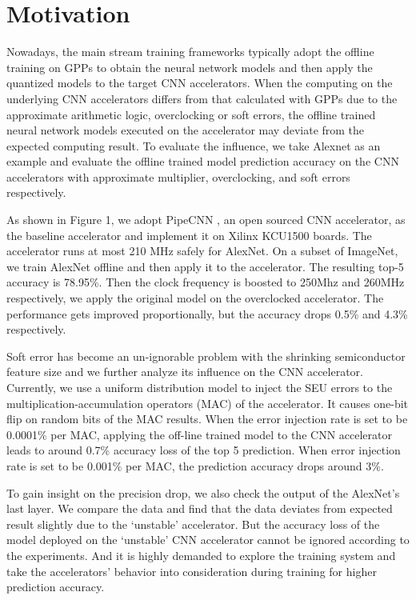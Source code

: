 \section{Motivation} \label{sec:motivation}
Nowadays, the main stream training frameworks typically adopt the offline training
on GPPs to obtain the neural network models and then apply the quantized models to the 
target CNN accelerators. When the computing on the underlying CNN accelerators differs
from that calculated with GPPs due to the approximate arithmetic logic, overclocking or 
soft errors, the offline trained neural network models executed on the accelerator 
may deviate from the expected computing result. To evaluate the influence, 
we take Alexnet as an example and evaluate the offline trained model prediction 
accuracy on the CNN accelerators with approximate multiplier, 
overclocking, and soft errors respectively. 


  As shown in Figure 1, we adopt PipeCNN\cite{pipecnn_2} , an open sourced CNN accelerator, 
as the baseline accelerator and implement it on Xilinx KCU1500 boards. The accelerator 
runs at most 210 MHz safely for AlexNet. On a subset of ImageNet, we train AlexNet offline 
and then apply it to the accelerator. The resulting top-5 accuracy is 78.95\%. Then the clock 
frequency is boosted to 250Mhz and 260MHz respectively, we apply the original model on 
the overclocked accelerator. The performance gets improved proportionally, but the 
accuracy drops 0.5\% and 4.3\% respectively.

  Soft error has become an un-ignorable problem with the shrinking semiconductor 
feature size and we further analyze its influence on the CNN accelerator. 
Currently, we use a uniform distribution model to inject the SEU errors to the 
multiplication-accumulation operators (MAC) of the accelerator. It causes one-bit 
flip on random bits of the MAC results. When the error injection rate is set to 
be 0.0001\% per MAC, applying the off-line trained model to the CNN accelerator 
leads to around 0.7\% accuracy loss of the top 5 prediction. When error injection 
rate is set to be 0.001\% per MAC, the prediction accuracy drops around 3\%.

  To gain insight on the precision drop, we also check the output of the AlexNet’s last 
layer. We compare the data and find that the data deviates from expected result slightly 
due to the ‘unstable’ accelerator. But the accuracy loss of the model deployed on 
the ‘unstable’ CNN accelerator cannot be ignored according to the experiments. 
And it is highly demanded to explore the training 
system and take the accelerators’ behavior into consideration during training for higher prediction accuracy.


